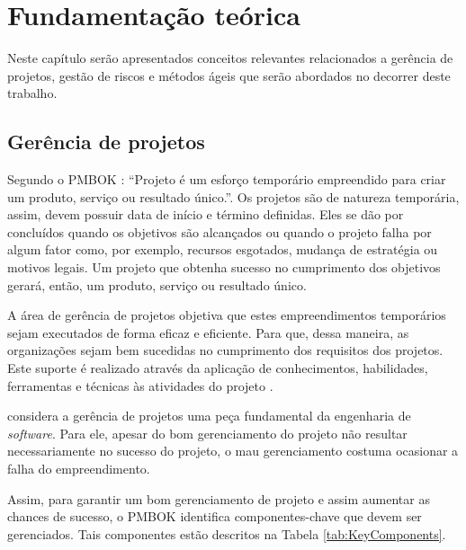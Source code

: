\documentclass[
    12pt,       %
    openright,      %
    twoside,      %
    a4paper,      %
    english,      %
    french,       %
    spanish,      %
    brazil,       %
    ]{abntex2}
\begin{document}
\chapter{Fundamentação teórica}
\label{sec:Fundamentacao}

Neste capítulo serão apresentados conceitos relevantes relacionados a gerência de projetos, gestão de riscos e métodos ágeis que serão abordados no decorrer deste trabalho.

\section{Gerência de projetos}

Segundo o PMBOK \cite{PMBOK:2017}: ``Projeto é um esforço temporário empreendido para criar um produto, serviço ou resultado único.''. Os projetos são de natureza temporária, assim, devem possuir data de início e término definidas. Eles se dão por concluídos quando os objetivos são alcançados ou quando o projeto falha por algum fator como, por exemplo, recursos esgotados, mudança de estratégia ou motivos legais. Um projeto que obtenha sucesso no cumprimento dos objetivos gerará, então, um produto, serviço ou resultado único. 

A área de gerência de projetos objetiva que estes empreendimentos temporários sejam executados de forma eficaz e eficiente. Para que, dessa maneira, as organizações sejam bem sucedidas no cumprimento dos requisitos dos projetos. Este suporte é realizado através da aplicação de conhecimentos, habilidades, ferramentas e técnicas às atividades do projeto \cite{PMBOK:2017}. 

 considera a gerência de projetos uma peça fundamental da engenharia de \textit{software}. Para ele, apesar do bom gerenciamento do projeto não resultar necessariamente no sucesso do projeto, o mau gerenciamento costuma ocasionar a falha do empreendimento. 

Assim, para garantir um bom gerenciamento de projeto e assim aumentar as chances de sucesso, o PMBOK \cite{PMBOK:2017} identifica componentes-chave que devem ser gerenciados. Tais componentes estão descritos na Tabela \ref{tab:KeyComponents}.
\end{document}

